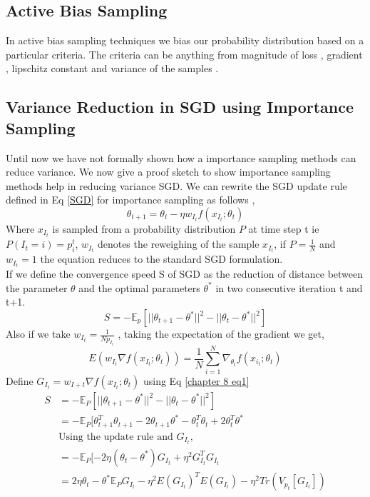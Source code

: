 \documentclass[a4paper,twoside]{iiththesis}
\theoremstyle{definition}
\theoremstyle{definition}
\theoremstyle{remark}
\begin{document}
\subsection{Active Bias Sampling}

In active bias sampling techniques we bias our probability distribution based on a particular criteria. The criteria can be anything from magnitude of loss \cite{katharopoulos2017biased}, gradient \cite{katharopoulos2018not}, lipschitz constant \cite{zhao2015stochastic} and variance of the samples \cite{chang2017active}. 

\subsection{Variance Reduction in SGD using Importance Sampling}
Until now we have not formally shown how a importance sampling methods can reduce variance. We now give a proof sketch to show importance sampling methods help in reducing variance SGD. We can rewrite the SGD update rule  defined in Eq \ref{SGD} for importance sampling as follows ,
\begin{equation}
\theta_{t+1} = \theta_{t} - \eta w_{I_t} f(x_{I_t}; \theta_t)
\end{equation}
Where $x_{I_t}$ is sampled from a probability distribution $P$ at time step t  ie $P(I_t = i) = p_i^t $, $w_{I_t}$ denotes the reweighing of the sample $x_{I_{t}}$, if $P = \frac{1}{N}$ and $w_{I_{t}} = 1$ the equation reduces to the standard SGD formulation.
\\
If we define the convergence speed S of SGD as the reduction of distance between the parameter $\theta$ and the optimal parameters $\theta^*$ in two consecutive iteration t and t+1.
\begin{equation}\label{chapter 8 eq1}
S = - \mathbb{E}_{p}[ || \theta_{t+1} - \theta^* || ^2 - || \theta_{t} - \theta^* || ^2 ]
\end{equation}
Also if we take $w_{I_t} = \frac{1}{N p_{I_t}}$ , taking the expectation of the gradient we get, 
\begin{equation}
E( w_{I_t} \nabla f(x_{I_t}; \theta_t)) = \frac{1}{N} \sum_{i=1}^N \nabla_{\theta_t}  f(x_{i_t}; \theta_t)
\end{equation}
Define $G_{I_t} = w_{I+t} \nabla f(x_{I_t}; \theta_t)$ using Eq \ref{chapter 8 eq1}
\begin{align}
S &= - \mathbb{E}_{P}[ || \theta_{t+1} - \theta^* || ^2 - || \theta_{t} - \theta^* || ^2 ] \\
&= - \mathbb{E}_{P} [\theta_{t+1}^T \theta_{t+1} - 2 \theta_{t+1} \theta^* - \theta_{t}^T\theta_{t} + 2 \theta_{t}^T \theta^* \\
& \text{Using the update rule and } G_{I_t}, \\
&= -\mathbb{E}_{P} [-2\eta(\theta_{t} - \theta^*) G_{I_t} + \eta^2 G_{I_t}^T G_{I_t} \\
&=2 \eta \theta_{t} - \theta^* \mathbb{E}_{P} G_{I_t} - \eta^2 E(G_{I_t})^T E(G_{I_t}) - \eta^2 Tr(V_{p_t}[G_{I_t}])
\end{align}
\end{document}
